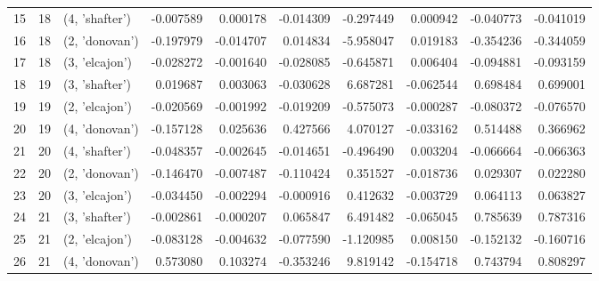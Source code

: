 \begin{tabular}{lrlrrrrrrr}
15 &     18 &  (4, 'shafter') & -0.007589 &   0.000178 & -0.014309 &  -0.297449 &  0.000942 &  -0.040773 & -0.041019 \\
16 &     18 &  (2, 'donovan') & -0.197979 &  -0.014707 &  0.014834 &  -5.958047 &  0.019183 &  -0.354236 & -0.344059 \\
17 &     18 &  (3, 'elcajon') & -0.028272 &  -0.001640 & -0.028085 &  -0.645871 &  0.006404 &  -0.094881 & -0.093159 \\
18 &     19 &  (3, 'shafter') &  0.019687 &   0.003063 & -0.030628 &   6.687281 & -0.062544 &   0.698484 &  0.699001 \\
19 &     19 &  (2, 'elcajon') & -0.020569 &  -0.001992 & -0.019209 &  -0.575073 & -0.000287 &  -0.080372 & -0.076570 \\
20 &     19 &  (4, 'donovan') & -0.157128 &   0.025636 &  0.427566 &   4.070127 & -0.033162 &   0.514488 &  0.366962 \\
21 &     20 &  (4, 'shafter') & -0.048357 &  -0.002645 & -0.014651 &  -0.496490 &  0.003204 &  -0.066664 & -0.066363 \\
22 &     20 &  (2, 'donovan') & -0.146470 &  -0.007487 & -0.110424 &   0.351527 & -0.018736 &   0.029307 &  0.022280 \\
23 &     20 &  (3, 'elcajon') & -0.034450 &  -0.002294 & -0.000916 &   0.412632 & -0.003729 &   0.064113 &  0.063827 \\
24 &     21 &  (3, 'shafter') & -0.002861 &  -0.000207 &  0.065847 &   6.491482 & -0.065045 &   0.785639 &  0.787316 \\
25 &     21 &  (2, 'elcajon') & -0.083128 &  -0.004632 & -0.077590 &  -1.120985 &  0.008150 &  -0.152132 & -0.160716 \\
26 &     21 &  (4, 'donovan') &  0.573080 &   0.103274 & -0.353246 &   9.819142 & -0.154718 &   0.743794 &  0.808297 \\
\bottomrule
\end{tabular}
